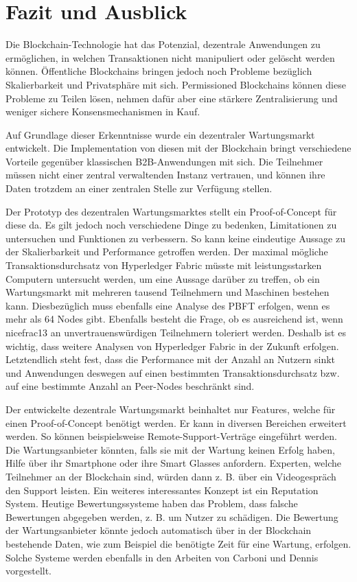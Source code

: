 \chapter{Fazit und Ausblick}
\label{cha:fazit}

Die Blockchain-Technologie hat das Potenzial, dezentrale Anwendungen zu ermöglichen, in welchen Transaktionen nicht manipuliert oder gelöscht werden können. Öffentliche Blockchains bringen jedoch noch Probleme bezüglich Skalierbarkeit und Privatsphäre mit sich. Permissioned Blockchains können diese Probleme zu Teilen lösen, nehmen dafür aber eine stärkere Zentralisierung und weniger sichere Konsensmechanismen in Kauf. 

Auf Grundlage dieser Erkenntnisse wurde ein dezentraler Wartungsmarkt entwickelt. Die Implementation von diesen mit der Blockchain bringt verschiedene Vorteile gegenüber klassischen B2B-Anwendungen mit sich. Die Teilnehmer müssen nicht einer zentral verwaltenden Instanz vertrauen, und können ihre Daten trotzdem an einer zentralen Stelle zur Verfügung stellen.

Der Prototyp des dezentralen Wartungsmarktes stellt ein Proof-of-Concept für diese da. Es gilt jedoch noch verschiedene Dinge zu bedenken, Limitationen zu untersuchen und Funktionen zu verbessern. So kann keine eindeutige Aussage zu der Skalierbarkeit und Performance getroffen werden. Der maximal mögliche Transaktionsdurchsatz von Hyperledger Fabric müsste mit leistungsstarken Computern untersucht werden, um eine Aussage darüber zu treffen, ob ein Wartungsmarkt mit mehreren tausend Teilnehmern und Maschinen bestehen kann. Diesbezüglich muss ebenfalls eine Analyse des PBFT erfolgen, wenn es mehr als 64 Nodes gibt. Ebenfalls besteht die Frage, ob es ausreichend ist, wenn nicefrac{1}{3} an unvertrauenswürdigen Teilnehmern toleriert werden. Deshalb ist es wichtig, dass weitere Analysen von Hyperledger Fabric in der Zukunft erfolgen. Letztendlich steht fest, dass die Performance mit der Anzahl an Nutzern sinkt und Anwendungen deswegen auf einen bestimmten Transaktionsdurchsatz bzw. auf eine bestimmte Anzahl an Peer-Nodes beschränkt sind. 

Der entwickelte dezentrale Wartungsmarkt beinhaltet nur Features, welche für einen Proof-of-Concept benötigt werden. Er kann in diversen Bereichen erweitert werden. So können beispielsweise Remote-Support-Verträge eingeführt werden. Die Wartungsanbieter könnten, falls sie mit der Wartung keinen Erfolg haben, Hilfe über ihr Smartphone oder ihre Smart Glasses anfordern. Experten, welche Teilnehmer an der Blockchain sind, würden dann z. B. über ein Videogespräch den Support leisten. Ein weiteres interessantes Konzept ist ein Reputation System. Heutige Bewertungssysteme haben das Problem, dass falsche Bewertungen abgegeben werden, z. B. um Nutzer zu schädigen. Die Bewertung der Wartungsanbieter könnte jedoch automatisch über in der Blockchain bestehende Daten, wie zum Beispiel die benötigte Zeit für eine Wartung, erfolgen. Solche Systeme werden ebenfalls in den Arbeiten von Carboni \cite{CarboniFeedbackbasedReputation2015} und Dennis \cite{DennisRepblocknext2015} vorgestellt.

